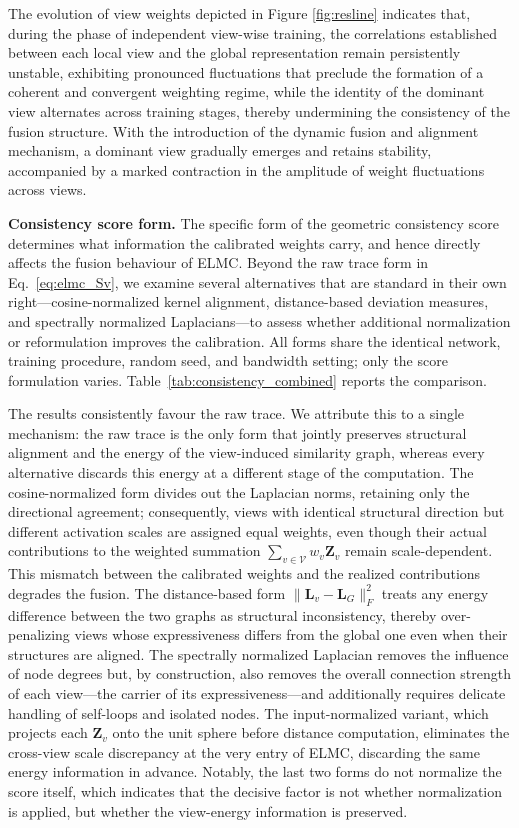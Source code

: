 \documentclass[10pt, journal, compsoc]{IEEEtran}
\newif\ifshowrevision
\newenvironment{revpar}{%
  \ifshowrevision
    \color{blue}%
  \fi
}{}
\begin{document}
The evolution of view weights depicted in Figure \ref{fig:resline} indicates that, during the phase of independent view-wise training, the correlations established between each local view and the global representation remain persistently unstable, exhibiting pronounced fluctuations that preclude the formation of a coherent and convergent weighting regime, while the identity of the dominant view alternates across training stages, thereby undermining the consistency of the fusion structure. With the introduction of the dynamic fusion and alignment mechanism, a dominant view gradually emerges and retains stability, accompanied by a marked contraction in the amplitude of weight fluctuations across views.

\begin{revpar}
\textbf{Consistency score form.} The specific form of the geometric consistency score determines what information the calibrated weights carry, and hence directly affects the fusion behaviour of ELMC. Beyond the raw trace form in Eq.~\eqref{eq:elmc_Sv}, we examine several alternatives that are standard in their own right---cosine-normalized kernel alignment, distance-based deviation measures, and spectrally normalized Laplacians---to assess whether additional normalization or reformulation improves the calibration. All forms share the identical network, training procedure, random seed, and bandwidth setting; only the score formulation varies. Table~\ref{tab:consistency_combined} reports the comparison.

The results consistently favour the raw trace. We attribute this to a single mechanism: the raw trace is the only form that jointly preserves structural alignment and the energy of the view-induced similarity graph, whereas every alternative discards this energy at a different stage of the computation. The cosine-normalized form divides out the Laplacian norms, retaining only the directional agreement; consequently, views with identical structural direction but different activation scales are assigned equal weights, even though their actual contributions to the weighted summation $\sum_{v\in\mathcal{V}}w_{v}\mathbf{Z}_{v}$ remain scale-dependent. This mismatch between the calibrated weights and the realized contributions degrades the fusion. The distance-based form $\lVert\mathbf{L}_{v}-\mathbf{L}_{G}\rVert_{F}^{2}$ treats any energy difference between the two graphs as structural inconsistency, thereby over-penalizing views whose expressiveness differs from the global one even when their structures are aligned. The spectrally normalized Laplacian removes the influence of node degrees but, by construction, also removes the overall connection strength of each view---the carrier of its expressiveness---and additionally requires delicate handling of self-loops and isolated nodes. The input-normalized variant, which projects each $\mathbf{Z}_{v}$ onto the unit sphere before distance computation, eliminates the cross-view scale discrepancy at the very entry of ELMC, discarding the same energy information in advance. Notably, the last two forms do not normalize the score itself, which indicates that the decisive factor is not whether normalization is applied, but whether the view-energy information is preserved.


\end{revpar}
\end{document}
